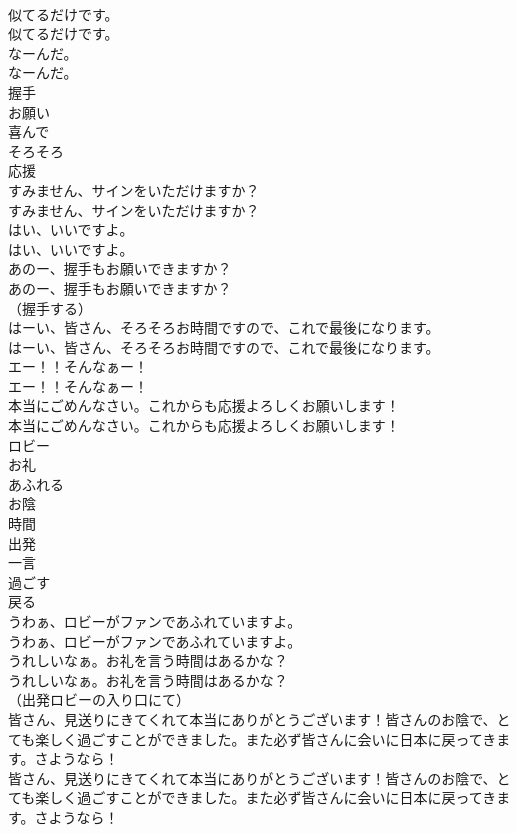 \documentclass[8pt]{extreport}
\begin{document}
\begin{CJK}{UTF8}{min}
\\	似てるだけです。	
\\	似てるだけです。
\\	なーんだ。	
\\	なーんだ。 
\\	握手
\\	お願い
\\	喜んで
\\	そろそろ
\\	応援
\\	すみません、サインをいただけますか？	
\\	すみません、サインをいただけますか？ 
\\	はい、いいですよ。	
\\	はい、いいですよ。 
\\	あのー、握手もお願いできますか？	
\\	あのー、握手もお願いできますか？ 
\\	（握手する）	
\\	はーい、皆さん、そろそろお時間ですので、これで最後になります。	
\\	はーい、皆さん、そろそろお時間ですので、これで最後になります。 
\\	エー！！そんなぁー！	
\\	エー！！そんなぁー！ 
\\	本当にごめんなさい。これからも応援よろしくお願いします！	
\\	本当にごめんなさい。これからも応援よろしくお願いします！ 
\\	ロビー
\\	お礼
\\	あふれる
\\	お陰
\\	時間
\\	出発
\\	一言
\\	過ごす
\\	戻る
\\	うわぁ、ロビーがファンであふれていますよ。	
\\	うわぁ、ロビーがファンであふれていますよ。 
\\	うれしいなぁ。お礼を言う時間はあるかな？	
\\	うれしいなぁ。お礼を言う時間はあるかな？ 
\\	（出発ロビーの入り口にて）	
\\	皆さん、見送りにきてくれて本当にありがとうございます！皆さんのお陰で、とても楽しく過ごすことができました。また必ず皆さんに会いに日本に戻ってきます。さようなら！	
\\	皆さん、見送りにきてくれて本当にありがとうございます！皆さんのお陰で、とても楽しく過ごすことができました。また必ず皆さんに会いに日本に戻ってきます。さようなら！ 

\end{CJK}
\end{document}
